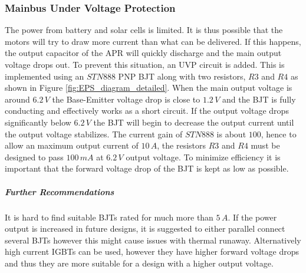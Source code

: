 \subsubsection{Mainbus Under Voltage Protection}
%
The power from battery and solar cells is limited. It is thus possible that the motors will try to draw more current than what can be delivered. If this happens, the output capacitor of the \ac{APR} will quickly discharge and the main output voltage drops out. To prevent this situation, an \ac{UVP} circuit is added. This is implemented using an $STN888$ PNP \ac{BJT} along with two resistors, $R3$ and $R4$ as shown in Figure \ref{fig:EPS_diagram_detailed}. When the main output voltage is around $6.2\,V$ the Base-Emitter voltage drop is close to $1.2\,V$ and the \ac{BJT} is fully conducting and effectively works as a short circuit. If the output voltage drops significantly below $6.2\,V$ the \ac{BJT} will begin to decrease the output current until the output voltage stabilizes. The current gain of $STN888$ is about $100$, hence to allow an maximum output current of $10\,A$, the resistors $R3$ and $R4$ must be designed to pass $100\,mA$ at $6.2\,V$ output voltage. To minimize efficiency it is important that the forward voltage drop of the \ac{BJT} is kept as low as possible.

\subparagraph*{Further Recommendations}
%
It is hard to find suitable \acp{BJT} rated for much more than $5\,A$. If the power output is increased in future designs, it is suggested to either parallel connect several \acp{BJT} however this might cause issues with thermal runaway. Alternatively high current \acp{IGBT} can be used, however they have higher forward voltage drops and thus they are more suitable for a design with a higher output voltage.


%
